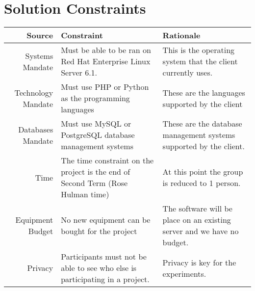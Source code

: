 \documentclass{article}
\begin{document}
\section{Solution Constraints}
\begin{table}[!hb]\footnotesize
    \begin{tabular}{|r|p{5.5cm}|p{5.5cm}|}
        \hline
        Source & Constraint & Rationale \\
        \hline
        Systems Mandate & Must be able to be ran on Red Hat Enterprise Linux Server 6.1. & This is the operating system that the client currently uses. \\
        \hline
        Technology Mandate & Must use PHP or Python as the programming languages & These are the languages supported by the client \\
        \hline
        Databases Mandate & Must use MySQL or PostgreSQL database management systems & These are the database management systems supported by the client. \\
        \hline
        Time  & The time constraint on the project is the end of Second Term (Rose Hulman time) & At this point the group is reduced to 1 person. \\
        \hline
        Equipment Budget & No new equipment can be bought for the project & The software will be place on an existing server and we have no budget. \\
        \hline
        Privacy & Participants must not be able to see who else is participating in a project. & Privacy is key for the experiments. \\
        \hline
    \end{tabular}
\end{table}
\end{document}
